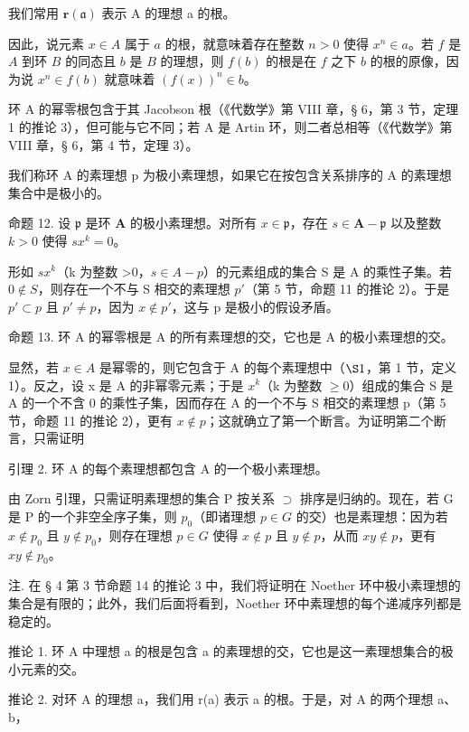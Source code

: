 我们常用 \(\mathbf{r}(\mathfrak{a})\) 表示 A 的理想 a 的根。

因此，说元素 \(x \in A\) 属于 \(a\) 的根，就意味着存在整数 \(n > 0\) 使得 \(x^n \in a\)。若 \(f\) 是 \(A\) 到环 \(B\) 的同态且 \(b\) 是 \(B\) 的理想，则 \(f(b)\) 的根是在 \(f\) 之下 \(b\) 的根的原像，因为说 \(x^n \in f(b)\) 就意味着 \((f(x))^n \in b\)。

环 A 的幂零根包含于其 Jacobson 根（《代数学》第 VIII 章，§ 6，第 3 节，定理 1 的推论 3），但可能与它不同；若 A 是 Artin 环，则二者总相等（《代数学》第 VIII 章，§ 6，第 4 节，定理 3）。

我们称环 A 的素理想 p 为极小素理想，如果它在按包含关系排序的 A 的素理想集合中是极小的。

命题 12. 设 \(\mathfrak{p}\) 是环 \(\mathbf{A}\) 的极小素理想。对所有 \(x \in \mathfrak{p}\)，存在 \(s \in \mathbf{A} - \mathfrak{p}\) 以及整数 \(k > 0\) 使得 \(sx^k = 0\)。

形如 \(sx^{k}\)（k 为整数 \textgreater0，\(s \in A - p\)）的元素组成的集合 S 是 A 的乘性子集。若 \(0 \notin S\)，则存在一个不与 S 相交的素理想 \(p'\)（第 5 节，命题 11 的推论 2）。于是 \(p' \subset p\) 且 \(p' \neq p\)，因为 \(x \notin p'\)，这与 p 是极小的假设矛盾。

命题 13. 环 A 的幂零根是 A 的所有素理想的交，它也是 A 的极小素理想的交。

显然，若 \(x \in A\) 是幂零的，则它包含于 A 的每个素理想中（\(\S 1\)，第 1 节，定义 1）。反之，设 x 是 A 的非幂零元素；于是 \(x^{k}\)（k 为整数 \(\geqslant 0\)）组成的集合 S 是 A 的一个不含 0 的乘性子集，因而存在 A 的一个不与 S 相交的素理想 p（第 5 节，命题 11 的推论 2），更有 \(x \notin p\)；这就确立了第一个断言。为证明第二个断言，只需证明

引理 2. 环 A 的每个素理想都包含 A 的一个极小素理想。

由 Zorn 引理，只需证明素理想的集合 P 按关系 \(\supset\) 排序是归纳的。现在，若 G 是 P 的一个非空全序子集，则 \(p_{0}\)（即诸理想 \(p \in G\) 的交）也是素理想：因为若 \(x \notin p_{0}\) 且 \(y \notin p_{0}\)，则存在理想 \(p \in G\) 使得 \(x \notin p\) 且 \(y \notin p\)，从而 \(xy \notin p\)，更有 \(xy \notin p_{0}\)。

注. 在 § 4 第 3 节命题 14 的推论 3 中，我们将证明在 Noether 环中极小素理想的集合是有限的；此外，我们后面将看到，Noether 环中素理想的每个递减序列都是稳定的。

推论 1. 环 A 中理想 a 的根是包含 a 的素理想的交，它也是这一素理想集合的极小元素的交。

推论 2. 对环 A 的理想 a，我们用 r(a) 表示 a 的根。于是，对 A 的两个理想 a、b，

